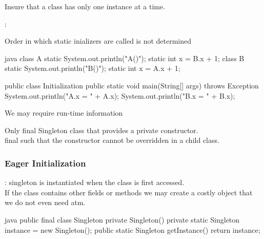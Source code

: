 \begin{intentbox}
  Insure that a class has only one instance at a time.
\end{intentbox}
\begin{sectionbox}\nospacing
  :
  \begin{itemizenosep}
      \item Order in which static inializers are called is not determined
      \begin{mintlinebox}{java}
        class A {
          static { System.out.println("A()"); }
          static int x = B.x + 1;
        }
        class B {
          static { System.out.println("B()"); }
          static int x = A.x + 1;
        }

        public class Initialization {
          public static void main(String[] args) throws Exception {
            System.out.println("A.x = " + A.x);
            System.out.println("B.x = " + B.x);
          }
        }
      \end{mintlinebox}
      \item We may require run-time information
  \end{itemizenosep}
\end{sectionbox}
\begin{partbox}[Participants]
  Only final Singleton class that provides a private constructor.\\
  final such that the constructor cannot be overridden in a child class.
\end{partbox}
\subsubsection{Eager Initialization}
\begin{sectionbox}\nospacing
  : singleton is instantiated when the class is first accessed.\\
  If the class contains other  fields or methods we may
  create a costly object that we do not even need atm.
\begin{mintlinebox}{java}
  public final class Singleton {
  private Singleton() { }
    private static Singleton instance = new Singleton();
      public static Singleton getInstance() {
      return instance;
    }
  }
\end{mintlinebox}
\end{sectionbox}
